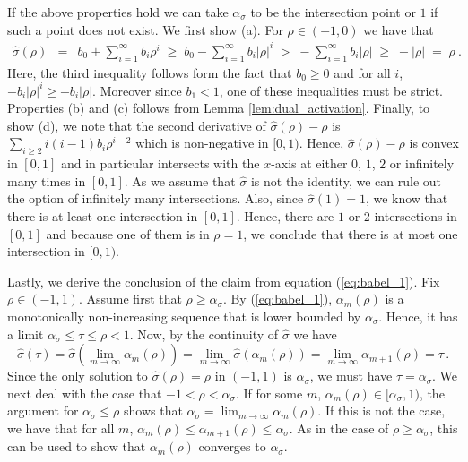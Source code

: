 If the above properties hold we can take $\alpha_\sigma$ to be the
intersection point or $1$ if such a point does not exist.
We first show (a). For $\rho\in (-1,0)$ we have that
\begin{eqnarray*}
\hat{\sigma}(\rho) &=& b_0 + \sum_{i=1}^\infty b_i\rho^i
\;\ge \; b_0 - \sum_{i=1}^\infty b_i |\rho|^i
\; > \;  - \sum_{i=1}^\infty b_i |\rho|
\; \ge \;  - |\rho| \; = \; \rho ~.
\end{eqnarray*}
Here, the third inequality follows form the fact that $b_0 \ge 0$ and for
all $i$, $-b_i|\rho|^i \ge -b_i|\rho|$. Moreover since $b_1<1$, one of these
inequalities must be strict.
%
Properties (b) and (c) follows from Lemma \ref{lem:dual_activation}. Finally, to show (d), we note
that the second derivative of $\hat{\sigma}(\rho) - \rho$ is $
\sum_{i \geq 2} i(i-1)b_i \rho^{i-2}$ which is non-negative in $[0,1)$.
Hence, $\hat{\sigma}(\rho) - \rho$ is convex in $[0,1]$ and in particular
intersects with the $x$-axis at either $0$, $1$, $2$ or infinitely many times
in $[0,1]$. As we assume that $\hat{\sigma}$ is not the identity, we can
rule out the option of infinitely many intersections. Also, since
$\hat{\sigma}(1)=1$, we know that there is at least one intersection in
$[0,1]$. Hence, there are $1$ or $2$ intersections in $[0,1]$ and because one
of them is in $\rho=1$, we conclude that there is at most one intersection
in $[0,1)$.

Lastly, we derive the conclusion of the claim from equation (\ref{eq:babel_1}).
Fix $\rho\in (-1,1)$. Assume first that $\rho \ge \alpha_\sigma$. By
(\ref{eq:babel_1}), $\alpha_m(\rho)$ is a monotonically non-increasing
sequence that is lower bounded by $\alpha_\sigma$. Hence, it has a limit
$\alpha_\sigma \le \tau \le \rho < 1$. Now, by the continuity of
$\hat{\sigma}$ we have
\[
\hat{\sigma}(\tau) = \hat{\sigma}\left(\lim_{m\to\infty}\alpha_m(\rho)\right)
 = \lim_{m\to\infty}\hat{\sigma}(\alpha_m(\rho))
  = \lim_{m\to\infty}\alpha_{m+1}(\rho) = \tau \,.
\]
Since the only solution to $\hat{\sigma}(\rho) = \rho$ in $(-1,1)$ is
$\alpha_\sigma$, we must have $\tau = \alpha_\sigma$. We next deal with the
case that $-1<\rho < \alpha_\sigma$. If for some $m$, $\alpha_m(\rho)\in
[\alpha_\sigma,1)$, the argument for $\alpha_\sigma\le \rho$ shows that
$\alpha_\sigma = \lim_{m\to\infty}\alpha_m(\rho)$. If this is not the case,
we have that for all $m$, $\alpha_m(\rho)\le \alpha_{m+1}(\rho)\le
\alpha_\sigma$. As in the case of $\rho\ge \alpha_\sigma$, this can be used
to show that $\alpha_m(\rho)$ converges to $\alpha_\sigma$.
%
\proofbox
